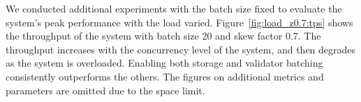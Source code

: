 We conducted additional experiments with the batch size fixed to evaluate the system's peak performance with the load varied. Figure~\ref{fig:load_z0.7:tps} shows the throughput of the system with batch size 20 and skew factor 0.7. The throughput increases with the concurrency level of the system, and then degrades as the system is overloaded. Enabling both storage and validator batching consistently outperforms the others. The figures on additional metrics and parameters are omitted due to the space limit.

